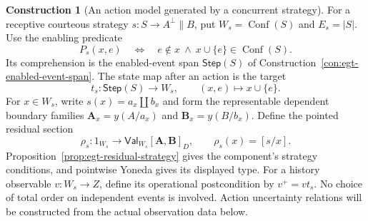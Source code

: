 \documentclass[11pt,a4paper]{article}
\numberwithin{equation}{section}
\theoremstyle{definition}
\newtheorem{construction}[construction]{Construction}
\theoremstyle{remark}
\theoremstyle{plain}
\begin{document}
\begin{construction}[An action model generated by a concurrent strategy]
\label{con:egt-strategy-generated-action}
For a receptive courteous strategy $s:S\to A^\perp\parallel B$, put
$W_s=\operatorname{Conf}(S)$ and $E_s=|S|$. Use the enabling predicate
\[
 P_s(x,e)\quad\Longleftrightarrow\quad
   e\notin x\ \wedge\ x\cup\{e\}\in\operatorname{Conf}(S).
\]
Its comprehension is the enabled-event span
$\mathsf{Step}(S)$ of Construction~\ref{con:egt-enabled-event-span}.
The state map after an action is the target
\[
 t_s:\mathsf{Step}(S)\longrightarrow W_s,
 \qquad (x,e)\longmapsto x\cup\{e\}.
\]
For $x\in W_s$, write $s(x)=a_x\amalg b_x$ and form the
representable dependent boundary families
$\mathbf A_x=y(A/a_x)$ and $\mathbf B_x=y(B/b_x)$.
Define the pointed residual section
\[
 \rho_s:1_{W_s}\longrightarrow
       \mathsf{Val}_{W_s}[\mathbf A,\mathbf B]_D,
 \qquad \rho_s(x)=[s/x].
\]
Proposition~\ref{prop:egt-residual-strategy} gives the component's
strategy conditions, and pointwise Yoneda gives its displayed type.
For a history observable $v:W_s\to Z$, define its operational
postcondition by $v^+=vt_s$. No choice of total order on independent
events is involved. Action uncertainty relations will be constructed
from the actual observation data below.
\end{construction}
\end{document}
